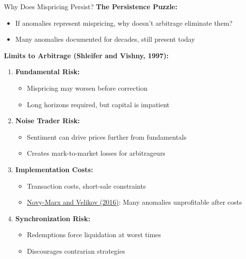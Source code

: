 \documentclass{beamer}
\begin{document}
\begin{frame}{Why Does Mispricing Persist?}
    \textbf{The Persistence Puzzle:}
    \begin{itemize}
        \item If anomalies represent mispricing, why doesn't arbitrage eliminate them?
        \item Many anomalies documented for decades, still present today
    \end{itemize}
    
    \vspace{0.3cm}
    \textbf{Limits to Arbitrage (Shleifer and Vishny, 1997):}
    \begin{enumerate}
        \item \textbf{Fundamental Risk:}
        \begin{itemize}
            \item Mispricing may worsen before correction
            \item Long horizons required, but capital is impatient
        \end{itemize}
        \item \textbf{Noise Trader Risk:}
        \begin{itemize}
            \item Sentiment can drive prices further from fundamentals
            \item Creates mark-to-market losses for arbitrageurs
        \end{itemize}
        \item \textbf{Implementation Costs:}
        \begin{itemize}
            \item Transaction costs, short-sale constraints
            \item \textcolor{blue}{\href{https://doi.org/10.1093/rfs/hhv063}{Novy-Marx and Velikov (2016)}}: Many anomalies unprofitable after costs
        \end{itemize}
        \item \textbf{Synchronization Risk:}
        \begin{itemize}
            \item Redemptions force liquidation at worst times
            \item Discourages contrarian strategies
        \end{itemize}
    \end{enumerate}
\end{frame}
\end{document}
